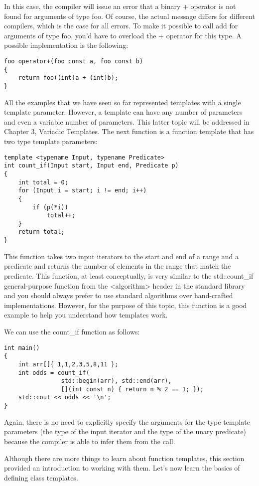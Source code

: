 In this case, the compiler will issue an error that a binary + operator is not found for arguments of type foo. Of course, the actual message differs for different compilers, which is the case for all errors. To make it possible to call add for arguments of type foo, you'd have to overload the + operator for this type. A possible implementation is the following:

\begin{lstlisting}[style=styleCXX]
foo operator+(foo const a, foo const b)
{
	return foo((int)a + (int)b);
}
\end{lstlisting}

All the examples that we have seen so far represented templates with a single template parameter. However, a template can have any number of parameters and even a variable number of parameters. This latter topic will be addressed in Chapter 3, Variadic Templates. The next function is a function template that has two type template parameters:

\begin{lstlisting}[style=styleCXX]
template <typename Input, typename Predicate>
int count_if(Input start, Input end, Predicate p)
{
	int total = 0;
	for (Input i = start; i != end; i++)
	{
		if (p(*i))
			total++;
	}
	return total;
}
\end{lstlisting}

This function takes two input iterators to the start and end of a range and a predicate and returns the number of elements in the range that match the predicate. This function, at least conceptually, is very similar to the std::count\_if general-purpose function from the <algorithm> header in the standard library and you should always prefer to use standard algorithms over hand-crafted implementations. However, for the purpose of this topic, this function is a good example to help you understand how templates work.

We can use the count\_if function as follows:

\begin{lstlisting}[style=styleCXX]
int main()
{
	int arr[]{ 1,1,2,3,5,8,11 };
	int odds = count_if(
				std::begin(arr), std::end(arr),
				[](int const n) { return n % 2 == 1; });
	std::cout << odds << '\n';
}
\end{lstlisting}

Again, there is no need to explicitly specify the arguments for the type template parameters (the type of the input iterator and the type of the unary predicate) because the compiler is able to infer them from the call.

Although there are more things to learn about function templates, this section provided an introduction to working with them. Let's now learn the basics of defining class templates.


















